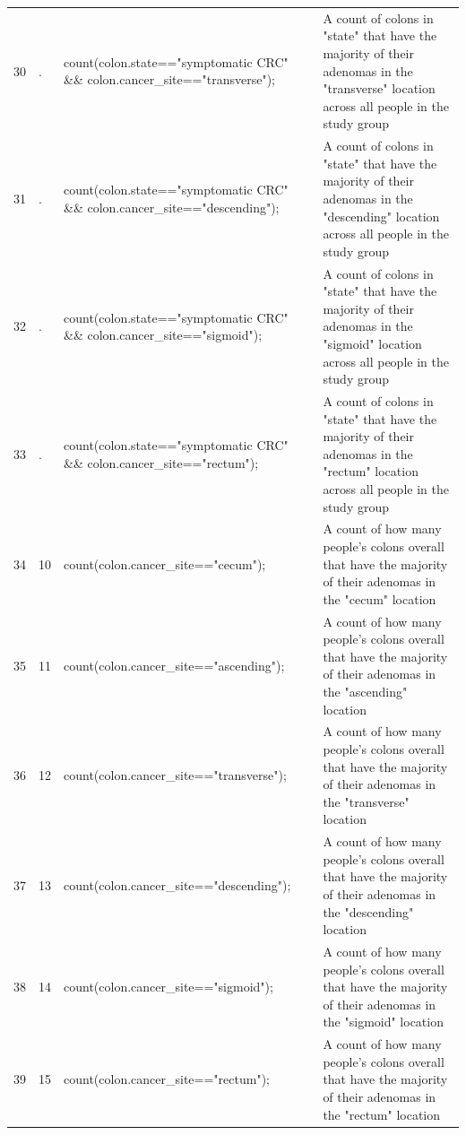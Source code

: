 \documentclass[11pt]{article}
\begin{document}
\begin{landscape}
\begin{longtable}{||l|l|p{11.3cm}|p{11.3cm}||}
30           & .       & count(colon.state=="symptomatic CRC" \&\& colon.cancer\_site=="transverse");   &   A count of colons in "state" that have the majority of their adenomas in the "transverse" location across all people in the study group \\
31           & .       & count(colon.state=="symptomatic CRC" \&\& colon.cancer\_site=="descending");   &   A count of colons in "state" that have the majority of their adenomas in the "descending" location across all people in the study group \\
32           & .       & count(colon.state=="symptomatic CRC" \&\& colon.cancer\_site=="sigmoid");      &   A count of colons in "state" that have the majority of their adenomas in the "sigmoid" location across all people in the study group \\
33           & .       & count(colon.state=="symptomatic CRC" \&\& colon.cancer\_site=="rectum");       &   A count of colons in "state" that have the majority of their adenomas in the "rectum" location across all people in the study group \\
34           & 10      & count(colon.cancer\_site=="cecum");                                            & A count of how many people's colons overall that have the majority of their adenomas in the "cecum" location \\
35           & 11      & count(colon.cancer\_site=="ascending");                                        & A count of how many people's colons overall that have the majority of their adenomas in the "ascending" location \\
36           & 12      & count(colon.cancer\_site=="transverse");                                       & A count of how many people's colons overall that have the majority of their adenomas in the "transverse" location \\
37           & 13      & count(colon.cancer\_site=="descending");                                       & A count of how many people's colons overall that have the majority of their adenomas in the "descending" location \\
38           & 14      & count(colon.cancer\_site=="sigmoid");                                          & A count of how many people's colons overall that have the majority of their adenomas in the "sigmoid" location \\
39           & 15      & count(colon.cancer\_site=="rectum");                                           & A count of how many people's colons overall that have the majority of their adenomas in the "rectum" location \\

\end{longtable}
\end{landscape}
\end{document}
